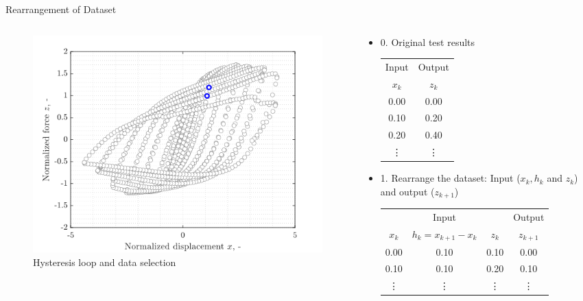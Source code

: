 \documentclass[9pt]{beamer}
\newcounter{frame}[frame]
\begin{document}
\begin{frame}{Rearrangement of Dataset}
\begin{columns}
\begin{column}{0.4\textwidth}
\begin{figure}
	\includegraphics[height=.45\textheight]{dataSelection01}
	\caption{Hysteresis loop and data selection}
\end{figure}
\end{column}
\begin{column}{0.58\textwidth}  %
\begin{itemize}
	\item 0. Original test results
	\begin{table}
\small
\begin{tabular}{@{}cc@{}}
\toprule
Input & Output \\ 
$x_k$ & $z_k$ \\ \midrule
0.00 & 0.00 \\ 
0.10 & 0.20 \\ 
0.20 & 0.40 \\
\vdots & \vdots \\ 
\bottomrule 
\end{tabular} 	
	\end{table}
\item 1. Rearrange the dataset: Input ($x_k, h_k$ and $z_k$) and output ($z_{k+1}$)
	\begin{table}
\small
\begin{tabular}{@{}cccc@{}}
\toprule
\multicolumn{3}{c}{Input} & Output \\ 
$x_k$ & $h_k=x_{k+1}-x_k$ & $z_k$ & $z_{k+1}$\\ \midrule
0.00 & 0.10 & 0.10 & 0.00 \\ 
0.10 & 0.10 & 0.20 & 0.10 \\ 
\vdots & \vdots & \vdots & \vdots \\ 
\bottomrule 
\end{tabular} 	
	\end{table}
\end{itemize}
\end{column}
\end{columns}
\end{frame}
\end{document}
